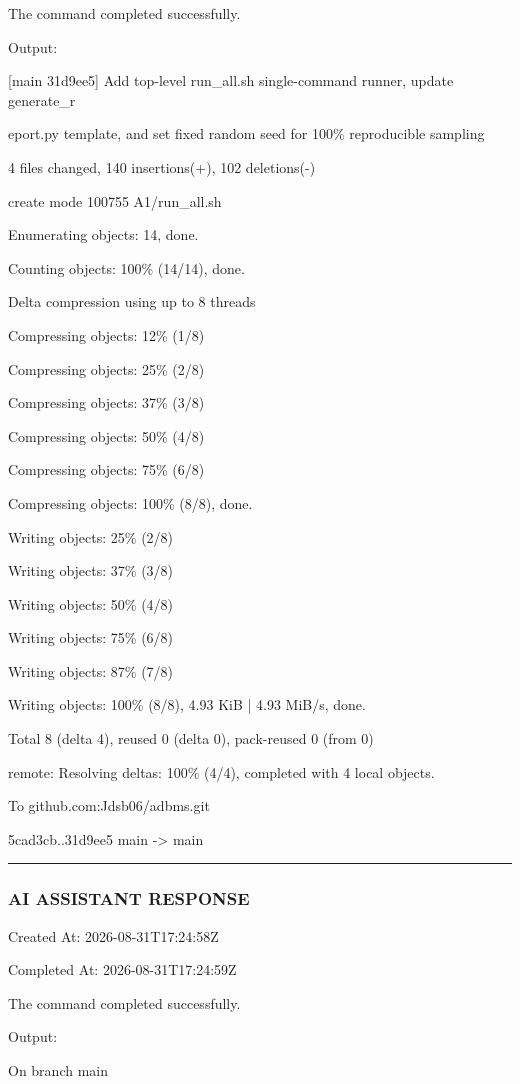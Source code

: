 \documentclass[11pt,a4paper]{article}
\begin{document}
The command completed successfully.

Output:

[main 31d9ee5] Add top-level run\_all.sh single-command runner, update generate\_r

eport.py template, and set fixed random seed for 100\% reproducible sampling

4 files changed, 140 insertions(+), 102 deletions(-)

create mode 100755 A1/run\_all.sh

Enumerating objects: 14, done.

Counting objects: 100\% (14/14), done.

Delta compression using up to 8 threads

Compressing objects:  12\% (1/8)

Compressing objects:  25\% (2/8)

Compressing objects:  37\% (3/8)

Compressing objects:  50\% (4/8)

Compressing objects:  75\% (6/8)

Compressing objects: 100\% (8/8), done.

Writing objects:  25\% (2/8)

Writing objects:  37\% (3/8)

Writing objects:  50\% (4/8)

Writing objects:  75\% (6/8)

Writing objects:  87\% (7/8)

Writing objects: 100\% (8/8), 4.93 KiB | 4.93 MiB/s, done.

Total 8 (delta 4), reused 0 (delta 0), pack-reused 0 (from 0)

remote: Resolving deltas: 100\% (4/4), completed with 4 local objects.

To github.com:Jdsb06/adbms.git

5cad3cb..31d9ee5  main -> main


\hrule

\subsubsection{AI ASSISTANT RESPONSE}

Created At: 2026-08-31T17:24:58Z

Completed At: 2026-08-31T17:24:59Z


The command completed successfully.

Output:

On branch main
\end{document}
